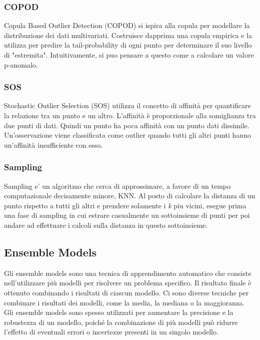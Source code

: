 \subsubsection{COPOD}
Copula Based Outlier Detection (COPOD) si ispira alla copula per modellare la distribuzione dei dati multivariati. Costruisce dapprima una copula empirica e la utilizza per predire la tail-probability di ogni punto per determinare il suo
livello di "estremita". Intuitivamente, si puo pensare a questo come a calcolare
un valore p-anomalo.

\subsubsection{SOS}
Stochastic Outlier Selection (SOS) utilizza il concetto di affinità per quantificare la relazione tra un punto e un altro. L'affinità è proporzionale alla somiglianza tra due punti di dati. Quindi un punto ha poca affinità con un punto dati dissimile. 
Un'osservazione viene classificata come outlier quando tutti gli altri punti hanno un'affinità insufficiente con esso.

\subsubsection{Sampling}
Sampling e' un algoritmo che cerca di approssimare, a favore di un tempo computazionale decisamente minore, KNN. Al posto di calcolare la distanza di un punto rispetto a tutti gli altri e prendere solamente i \textit{k} piu vicini, esegue prima una fase di sampling in cui estrare casualmente un sottoinsieme di punti per poi andare ad effettuare i calcoli sulla distanza in questo sottoinsieme.

\subsection{Ensemble Models}
Gli ensemble models sono una tecnica di apprendimento automatico che consiste nell'utilizzare più modelli per risolvere un problema specifico. Il risultato finale è ottenuto combinando i risultati di ciascun modello. Ci sono diverse tecniche per combinare i risultati dei modelli, come la media, la mediana o la maggioranza. Gli ensemble models sono spesso utilizzati per aumentare la precisione e la robustezza di un modello, poiché la combinazione di più modelli può ridurre l'effetto di eventuali errori o incertezze presenti in un singolo modello.


